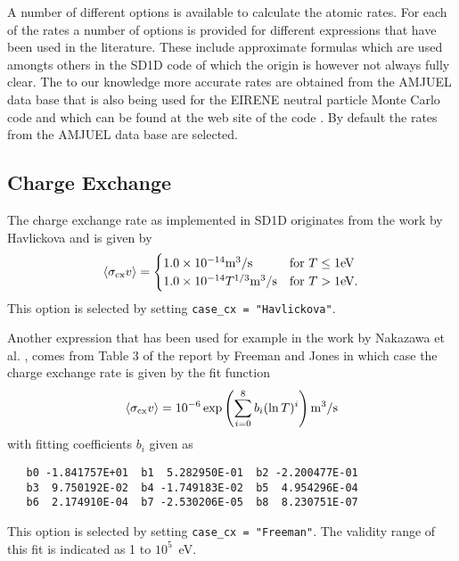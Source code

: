\documentclass[amsmath,amssymb,a4]{revtex4}
\begin{document}
A number of different options is available to calculate the atomic rates. For each of the rates a number of options is provided for different expressions that have been used in the literature. These include approximate formulas which are used amongts others in the SD1D code \cite{SD1D} of which the origin is however not always fully clear. The to our knowledge more accurate rates are obtained from the AMJUEL data base that is also being used for the EIRENE neutral particle Monte Carlo code and which can be found at the web site of the code \cite{EIRENE}. By default the rates from the AMJUEL data base are selected.


\subsection{Charge Exchange}

The charge exchange rate as implemented in SD1D originates from the work by Havlickova \cite{havlickova2013} and is given by \cite{SD1D}
\begin{equation}\label{charge_exchange_SD1D}
    \langle\sigma_{\rm cx} v\rangle = \begin{cases} 1.0 \times 10^{-14} {\rm m}^3/{\rm s}             & \mbox{for } T \le 1 {\rm eV} \\
                                        1.0 \times 10^{-14} T^{1/3} {\rm m}^3/{\rm s} & \mbox{for } T >   1 {\rm eV}. \end{cases}
\end{equation}
This option is selected by setting {\tt case\_cx = "Havlickova"}.

Another expression that has been used for example in the work by Nakazawa et al. \cite{nakazawa2000}, comes from Table 3 of the report by Freeman and Jones \cite{freeman1974} in which case the charge exchange rate is given by the fit function
\begin{equation}\label{charge_exchange_FJ}
    \langle\sigma_{\rm cx} v\rangle = 10^{-6} \exp\left( \sum_{i=0}^8 b_i (\ln T)^i \right)  {\rm m}^3/{\rm s}
\end{equation}
with fitting coefficients $b_i$ given as
\begin{small}\begin{verbatim}
   b0 -1.841757E+01  b1  5.282950E-01  b2 -2.200477E-01
   b3  9.750192E-02  b4 -1.749183E-02  b5  4.954296E-04
   b6  2.174910E-04  b7 -2.530206E-05  b8  8.230751E-07
\end{verbatim}\end{small}
This option is selected by setting {\tt case\_cx = "Freeman"}. The validity range of this fit is indicated as 1 to $10^5$~eV.
\end{document}
